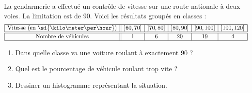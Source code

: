 
\begin{exercice}\label{exosmath-0533}

    La gendarmerie a effectué un contrôle de vitesse sur une route nationale à deux voies. La limitation est de \unit{90}{\kilo\meter\per\hour}. Voici les résultats groupés en classes :
    \begin{equation*}
        \begin{array}[]{|c||c|c|c|c|c|}
            \hline
        \text{Vitesse (en \si{\kilo\meter\per\hour})}&\mathopen] 60 , 70 \mathclose]&\mathopen] 70 , 80 \mathclose]&\mathopen] 80 , 90 \mathclose]&\mathopen] 90 , 100 \mathclose]&\mathopen] 100 , 120 \mathclose]\\
              \hline\hline
              \text{Nombre de véhicules}&1&6&20&19&4\\ 
              \hline 
               \end{array}
    \end{equation*}
    \begin{enumerate}
        \item
            Dans quelle classe va une voiture roulant à exactement \unit{90}{\kilo\meter\per\hour} ?
        \item
            Quel est le pourcentage de véhicule roulant trop vite ?
        \item
            Dessiner un histogramme représentant la situation.
    \end{enumerate}

\end{exercice}
